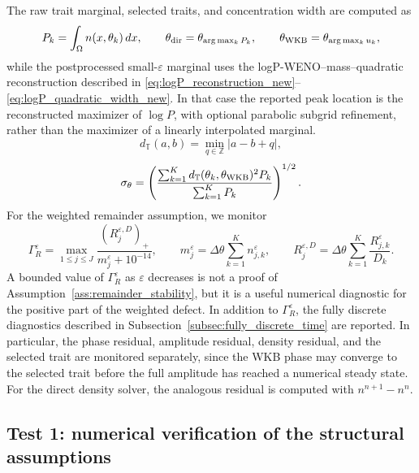 \documentclass[11pt]{article}
\begin{document}
The raw trait marginal, selected traits, and concentration width are computed as
\begin{equation}\label{eq:diagnostics_trait_new}
    P_k=\int_\Omega n(x,\theta_k)\,dx,
    \qquad
    \theta_{\rm dir}=\theta_{\arg\max_k P_k},
    \qquad
    \theta_{\rm WKB}=\theta_{\arg\max_k u_k},
\end{equation}
while the postprocessed small-\(\varepsilon\) marginal uses the logP-WENO--mass--quadratic reconstruction described in \eqref{eq:logP_reconstruction_new}--\eqref{eq:logP_quadratic_width_new}.  In that case the reported peak location is the reconstructed maximizer of \(\log P\), with optional parabolic subgrid refinement, rather than the maximizer of a linearly interpolated marginal.
\begin{equation}\label{eq:periodic_distance_new}
    d_{\mathbb T}(a,b)=\min_{q\in\mathbb Z}|a-b+q|,
\end{equation}
\begin{equation}\label{eq:sigma_theta_new}
    \sigma_\theta=
    \left(
    \frac{\sum_{k=1}^{K}d_{\mathbb T}(\theta_k,\theta_{\rm WKB})^2P_k}
         {\sum_{k=1}^{K}P_k}
    \right)^{1/2}.
\end{equation}
For the weighted remainder assumption, we monitor
\begin{equation}\label{eq:gamma_R_new}
    \Gamma_R^\varepsilon
    =
    \max_{1\le j\le J}
    \frac{(R_j^{\varepsilon,D})_+}{m_j^\varepsilon+10^{-14}},
    \qquad
    m_j^\varepsilon=\Delta\theta\sum_{k=1}^{K}n_{j,k}^\varepsilon,
    \qquad
    R_j^{\varepsilon,D}=\Delta\theta\sum_{k=1}^{K}\frac{R_{j,k}^\varepsilon}{D_k}.
\end{equation}
A bounded value of \(\Gamma_R^\varepsilon\) as \(\varepsilon\) decreases is not a proof of Assumption~\ref{ass:remainder_stability}, but it is a useful numerical diagnostic for the positive part of the weighted defect. {\color{red} In addition to \(\Gamma_R^\varepsilon\), the fully discrete diagnostics described in Subsection~\ref{subsec:fully_discrete_time} are reported. In particular, the phase residual, amplitude residual, density residual, and the selected trait are monitored separately, since the WKB phase may converge to the selected trait before the full amplitude has reached a numerical steady state.} For the direct density solver, the analogous residual is computed with \(n^{n+1}-n^n\).

\subsection{Test 1: numerical verification of the structural assumptions}\label{subsec:test_assumptions_new}
\end{document}
